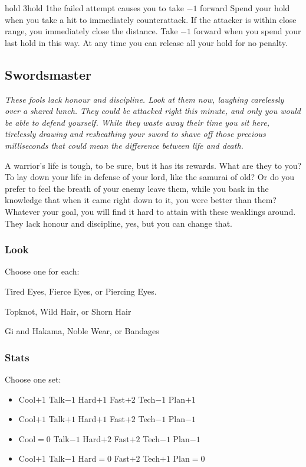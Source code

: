 {hold 3}{hold 1}{the failed attempt causes you to take $-1$ forward}
Spend your hold when you take a hit to immediately counterattack. If the attacker is within close range, you immediately close the distance. Take $-1$ forward when you spend your last hold in this way. At any time you can release all your hold for no penalty.



\subsection{Swordsmaster}
{\itshape These fools lack honour and discipline. Look at them now,
  laughing carelessly over a shared lunch. They could be attacked
  right this minute, and only you would be able to defend
  yourself. While they waste away their time you sit here, tirelessly
  drawing and resheathing your sword to shave off those precious
  milliseconds that could mean the difference between life and death.

A warrior's life is tough, to be sure, but it has its rewards. What
are they to you? To lay down your life in defense of your lord, like
the samurai of old? Or do you prefer to feel the breath of your enemy
leave them, while you bask in the knowledge that when it came right
down to it, you were better than them? Whatever your goal, you will
find it hard to attain with these weaklings around. They lack honour
and discipline, yes, but you can change that.}

\subsubsection{Look}

Choose one for each:

Tired Eyes, Fierce Eyes, or Piercing Eyes.

Topknot, Wild Hair, or Shorn Hair

Gi and Hakama, Noble Wear, or Bandages

\subsubsection{Stats}
Choose one set:
\begin{itemize}
\setlength\itemsep{0em}
\item Cool$+1$ Talk$-1$ Hard$+1$ Fast$+2$ Tech$-1$ Plan$+1$
\item Cool$+1$ Talk$+1$ Hard$+1$ Fast$+2$ Tech$-1$ Plan$-1$
\item Cool${=}0$ Talk$-1$ Hard$+2$ Fast$+2$ Tech$-1$ Plan$-1$
\item Cool$+1$ Talk$-1$ Hard${=}0$ Fast$+2$ Tech$+1$ Plan${=}0$
\end{itemize}

